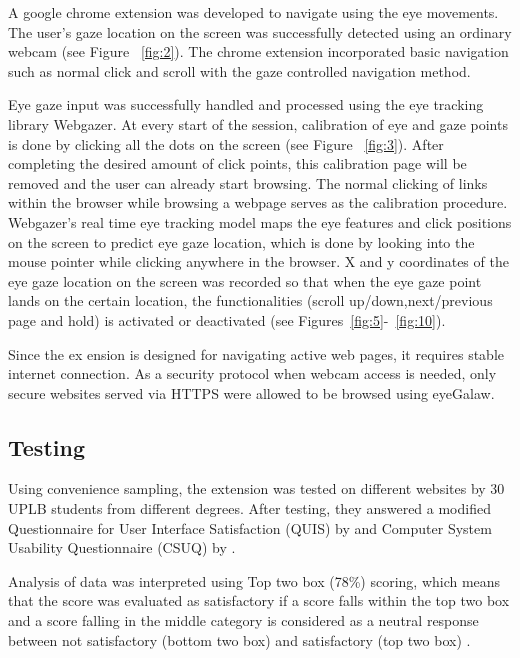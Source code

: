 \documentclass[journal]{./IEEE/IEEEtran}
\begin{document}
A google chrome extension was developed to navigate using the eye movements. The user's gaze location on the screen was successfully detected using an ordinary webcam (see Figure ~\ref{fig:2}). The chrome extension incorporated basic navigation such as normal click and scroll with the gaze controlled navigation method.

Eye gaze input was successfully handled and processed using the eye tracking library Webgazer. At every start of the session, calibration of eye and gaze points is done by clicking all the dots on the screen (see Figure ~\ref{fig:3}). After completing the desired amount of click points, this calibration page will be removed and the user can already start browsing. The normal clicking of links within the browser while browsing a webpage serves as the calibration procedure. Webgazer's real time eye tracking model maps the eye features and click positions on the screen to predict eye gaze location, which is done by looking into the mouse pointer while clicking anywhere in the browser. X and y coordinates of the eye gaze location on the screen was recorded so that when the eye gaze point lands on the certain location, the functionalities (scroll up/down,next/previous page and hold) is activated or deactivated (see Figures~\ref{fig:5}-~\ref{fig:10}).

Since the ex
ension is designed for navigating active web pages, it requires stable internet connection. As a security protocol when webcam access is needed, only secure websites served via HTTPS were allowed to be browsed using eyeGalaw. 

\subsection {Testing}

Using convenience sampling, the extension was tested on different websites by 30 UPLB students from different degrees. After testing, they answered a modified Questionnaire for User Interface Satisfaction (QUIS) by \cite   {lewis_1995} and Computer System Usability Questionnaire (CSUQ)  by \cite  {chin_diehl_norman_1988}.

Analysis of data was interpreted using Top two box (78\%) scoring, which means that the score was evaluated as satisfactory if a score falls within the top two box and a score falling in the middle category is considered as a neutral response between not satisfactory (bottom two box)  and satisfactory (top two box) \cite{interpret_survey_responses}.
\end{document}

